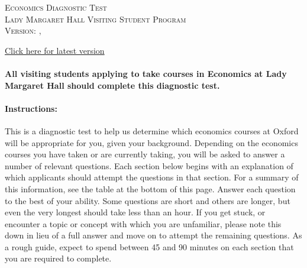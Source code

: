 \documentclass[addpoints,12pt]{exam}
\begin{document}
\begin{center}

  \textsc{\Large Economics Diagnostic Test \\ \normalsize Lady Margaret Hall Visiting Student Program \\ \vspace{0.5em} Version: \DTMtoday, \DTMcurrenttime}


\href{https://raw.githubusercontent.com/fditraglia/lmh-econ-diagnostic/main/lmh-econ-diagnostic.pdf}{Click here for latest version}

\vspace{5em}



\end{center}

\vspace{2em}

\paragraph{All visiting students applying to take courses in Economics at Lady Margaret Hall should complete this diagnostic test.}

\vspace{2em}

\paragraph{Instructions:} This is a diagnostic test to help us determine which economics courses at Oxford will be appropriate for you, given your background. Depending on the economics courses you have taken or are currently taking, you will be asked to answer a number of relevant questions. Each section below begins with an explanation of which applicants should attempt the questions in that section. For a summary of this information, see the table at the bottom of this page. Answer each question to the best of your ability. Some questions are short and others are longer, but even the very longest should take less than an hour. If you get stuck, or encounter a topic or concept with which you are unfamiliar, please note this down in lieu of a full answer and move on to attempt the remaining questions. As a rough guide, expect to spend between 45 and 90 minutes on each section that you are required to complete.
\end{document}
